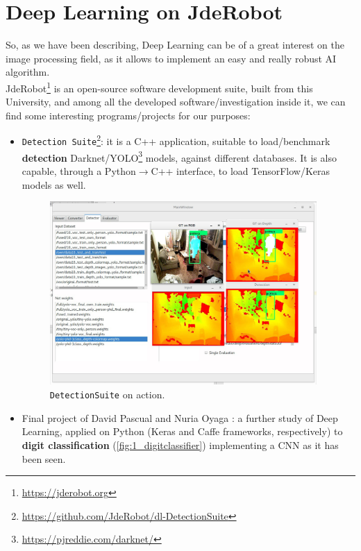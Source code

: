 \section{Deep Learning on JdeRobot}
\label{sec:dl_jderobot}
So, as we have been describing, Deep Learning can be of a great interest on the image processing field, as it allows to implement an easy and really robust AI algorithm.\\

JdeRobot\footnote{\url{https://jderobot.org}} is an open-source software development suite, built from  this University, and among all the developed software/investigation inside it, we can find some interesting programs/projects for our purposes:

\begin{itemize}
	\item \texttt{Detection Suite}\footnote{\url{https://github.com/JdeRobot/dl-DetectionSuite}}: it is a C++ application, suitable to load/benchmark \textbf{detection} Darknet/YOLO\footnote{\url{https://pjreddie.com/darknet/}} models, against different databases. It is also capable, through a Python$\rightarrow$C++ interface, to load TensorFlow/Keras models as well.
	
	\begin{figure}[h]
		\centering
		\includegraphics[width=4in]{images/detection_suite_depth}
		\caption{\texttt{DetectionSuite} on action.}
		\label{fig:1_detectionsuite}
	\end{figure}

	\item Final project of David Pascual \cite{dpascualhe} and Nuria Oyaga \cite{noyaga}: a further study of Deep Learning, applied on Python (Keras and Caffe frameworks, respectively) to \textbf{digit classification} (\autoref{fig:1_digitclassifier}) implementing a CNN as it has been seen.
	

\end{itemize}
